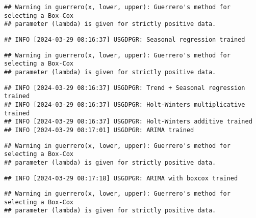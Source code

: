 \documentclass[
]{article}
\begin{document}
\begin{verbatim}
## Warning in guerrero(x, lower, upper): Guerrero's method for selecting a Box-Cox
## parameter (lambda) is given for strictly positive data.
\end{verbatim}

\begin{verbatim}
## INFO [2024-03-29 08:16:37] USGDPGR: Seasonal regression trained
\end{verbatim}

\begin{verbatim}
## Warning in guerrero(x, lower, upper): Guerrero's method for selecting a Box-Cox
## parameter (lambda) is given for strictly positive data.
\end{verbatim}

\begin{verbatim}
## INFO [2024-03-29 08:16:37] USGDPGR: Trend + Seasonal regression trained
## INFO [2024-03-29 08:16:37] USGDPGR: Holt-Winters multiplicative trained
## INFO [2024-03-29 08:16:37] USGDPGR: Holt-Winters additive trained
## INFO [2024-03-29 08:17:01] USGDPGR: ARIMA trained
\end{verbatim}

\begin{verbatim}
## Warning in guerrero(x, lower, upper): Guerrero's method for selecting a Box-Cox
## parameter (lambda) is given for strictly positive data.
\end{verbatim}

\begin{verbatim}
## INFO [2024-03-29 08:17:18] USGDPGR: ARIMA with boxcox trained
\end{verbatim}

\begin{verbatim}
## Warning in guerrero(x, lower, upper): Guerrero's method for selecting a Box-Cox
## parameter (lambda) is given for strictly positive data.
\end{verbatim}
\end{document}
